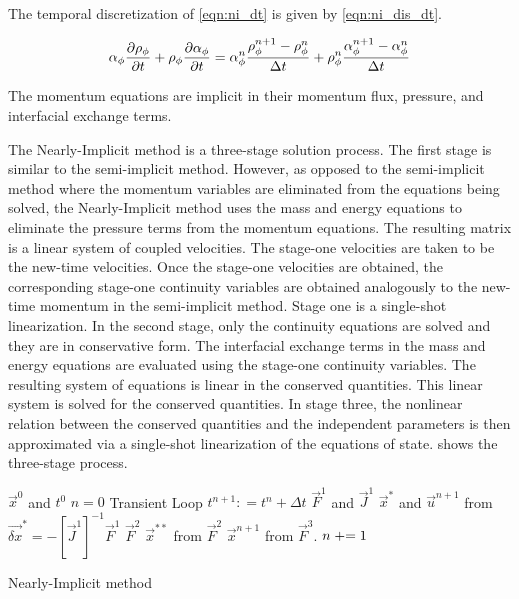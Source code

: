 The temporal discretization of \eqref{eqn:ni_dt} is given by \eqref{eqn:ni_dis_dt}.

\begin{equation}
\label{eqn:ni_dis_dt}
\alpha_{\phi} \frac{\partial \rho_{\phi}}{\partial t} + \rho_{\phi} \frac{\partial \alpha_{\phi}}{\partial t} = \alpha^{n}_{\phi} \frac{ \rho^{n+1}_{\phi} - \rho^{n}_{\phi}}{\dt{}} + \rho^{n}_{\phi} \frac{\alpha^{n+1}_{\phi} - \alpha^{n}_{\phi} }{\dt}
\end{equation}

The momentum equations are implicit in their momentum flux, pressure, and interfacial exchange terms.

The Nearly-Implicit method is a three-stage solution process.
The first stage is similar to the semi-implicit method.
However, as opposed to the semi-implicit method where the momentum variables are eliminated from the equations being solved, the Nearly-Implicit method uses the mass and energy equations to eliminate the pressure terms from the momentum equations.
The resulting matrix is a linear system of coupled velocities.
The stage-one velocities are taken to be the new-time velocities.
Once the stage-one velocities are obtained, the corresponding stage-one continuity variables are obtained analogously to the new-time momentum in the semi-implicit method.
Stage one is a single-shot linearization.
In the second stage, only the continuity equations are solved and they are in conservative form.
The interfacial exchange terms in the mass and energy equations are evaluated using the stage-one continuity variables.
The resulting system of equations is linear in the conserved quantities.
This linear system is solved for the conserved quantities.
In stage three, the nonlinear relation between the conserved quantities and the independent parameters is then approximated via a single-shot linearization of the equations of state.
 shows the three-stage process.

\begin{algo}[ht!]
\setlength{\baselineskip}{0.625\baselineskip}
\begin{algorithmic}[1]
\Require $\vec{x}^{0}$ and $t^{0}$
\Set $n = 0$
\Loop \; Transient Loop
    \Set $t^{n+1} : = t^{n} + \Delta t$
	\Calculate $\vec{F}^{1}$ and $\vec{J}^{1}$
	\Calculate $\vec{x}^{*}$ and $\vec{u}^{n+1}$ from $\vec{\delta x}^{*} = -\left[\vec{J}^{1}\right]^{-1} \vec{F}^{1}$
	\Calculate $\vec{F}^{2}$
	\Calculate $\vec{x}^{**}$ from $\vec{F}^{2}$
	\Calculate $\vec{x}^{n+1}$ from $\vec{F}^{3}$.
	\Set $n \mathrel{+}= 1$
\EndLoop
\end{algorithmic}
\caption{Nearly-Implicit method}
\label{alg:ni}
\end{algo}

